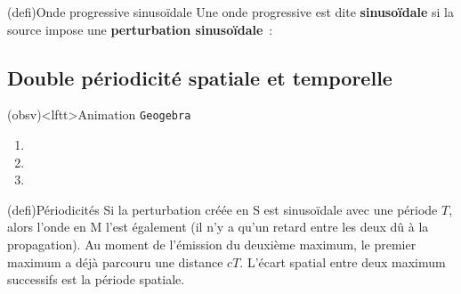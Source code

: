 \documentclass[../../main/main.tex]{subfiles}
\begin{document}
\begin{tcb}(defi){Onde progressive sinusoïdale}
	Une onde progressive est dite \textbf{sinusoïdale} si la source impose une
	\textbf{perturbation sinusoïdale}~:
	\psw{%
		\[
			\boxed{s (0,t) = g(t) = A \cos(\wt + \f_0)}
		\]
	}%
	\vspace{-15pt}
\end{tcb}



\subsection{Double périodicité spatiale et temporelle}
\begin{tcb}(obsv)<lftt>{Animation \texttt{Geogebra}}
	\begin{enumerate}
		\item {}
		\item {}
		\item {}
	\end{enumerate}
\end{tcb}

\begin{tcb*}[sidebyside, sidebyside align=top](defi){Périodicités}
	Si la perturbation créée en S est sinusoïdale avec une période $T$, alors
	l'onde en M l'est également (il n'y a qu'un retard entre les deux dû à la
	propagation).
	\tcblower
	Au moment de l'émission du deuxième maximum, le premier maximum a déjà
	parcouru une distance $cT$. L'écart spatial entre deux maximum successifs est
	la période spatiale.
\end{tcb*}
\end{document}
